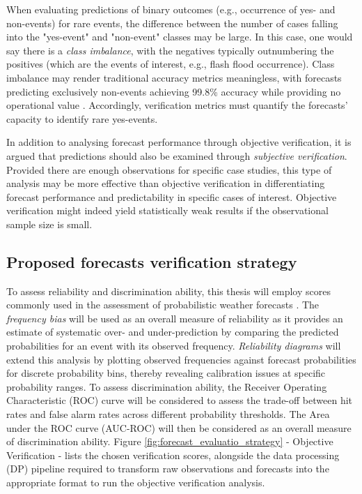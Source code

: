 When  evaluating predictions of binary outcomes (e.g., occurrence of yes- and non-events) for rare events, the difference between the number of cases falling into the "yes-event" and "non-event" classes may be large. In this case, one would say there is a \textit{class imbalance}, with the negatives typically outnumbering the positives (which are the events of interest, e.g., flash flood occurrence). Class imbalance may render traditional accuracy metrics meaningless, with forecasts predicting exclusively non-events achieving 99.8\% accuracy while providing no operational value \citep{Wilks_2020}. Accordingly, verification metrics must quantify the forecasts' capacity to identify rare yes-events. 

In  addition to analysing forecast performance through objective verification, it is argued that predictions should also be examined through \textit{subjective verification}. Provided there are enough observations for specific case studies, this type of analysis may be more effective than objective verification in differentiating forecast performance and predictability in specific cases of interest. Objective verification might indeed yield statistically weak results if the observational sample size is small. 


\subsection{Proposed forecasts verification strategy}

To  assess reliability and discrimination ability, this thesis will employ scores commonly used in the assessment of probabilistic weather forecasts \citep{Wilks_2020, Jolliffe_2012}. The \textit{frequency bias} will be used as an overall measure of reliability as it provides an estimate of systematic over- and under-prediction by comparing the predicted probabilities for an event with its observed frequency. \textit{Reliability diagrams} will extend this analysis by plotting observed frequencies against forecast probabilities for discrete probability bins, thereby revealing calibration issues at specific probability ranges. To assess discrimination ability, the Receiver Operating Characteristic (ROC) curve will be considered to assess the trade-off between hit rates and false alarm rates across different probability thresholds. The Area under the ROC curve (AUC-ROC) will then be considered as an overall measure of discrimination ability. Figure \ref{fig:forecast_evaluatio_strategy} - Objective Verification - lists the chosen verification scores, alongside the data processing (DP) pipeline required to transform raw observations and forecasts into the appropriate format to run the objective verification analysis.

